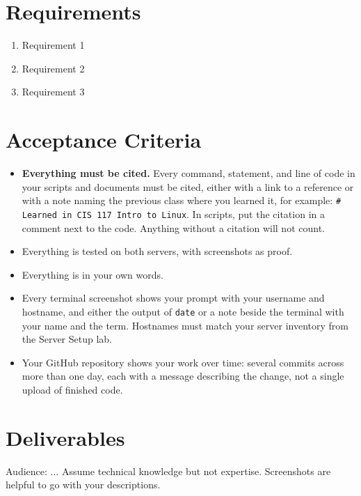 \documentclass[12pt]{article}
\begin{document}
\section*{Requirements}
\begin{enumerate}
    \item Requirement 1
    \item Requirement 2
    \item Requirement 3
\end{enumerate}

\section*{Acceptance Criteria}
\begin{itemize}
    \item \textbf{Everything must be cited.} Every command, statement, and line of code in your scripts and documents must be cited, either with a link to a reference or with a note naming the previous class where you learned it, for example: \texttt{\# Learned in CIS 117 Intro to Linux}. In scripts, put the citation in a comment next to the code. Anything without a citation will not count.
    \item Everything is tested on both servers, with screenshots as proof.
    \item Everything is in your own words.
    \item Every terminal screenshot shows your prompt with your username and hostname, and either the output of \texttt{date} or a note beside the terminal with your name and the term. Hostnames must match your server inventory from the Server Setup lab.
    \item Your GitHub repository shows your work over time: several commits across more than one day, each with a message describing the change, not a single upload of finished code.
\end{itemize}

\section*{Deliverables}
Audience: ... Assume technical knowledge but not expertise.  Screenshots are helpful to go with your descriptions.
\end{document}
